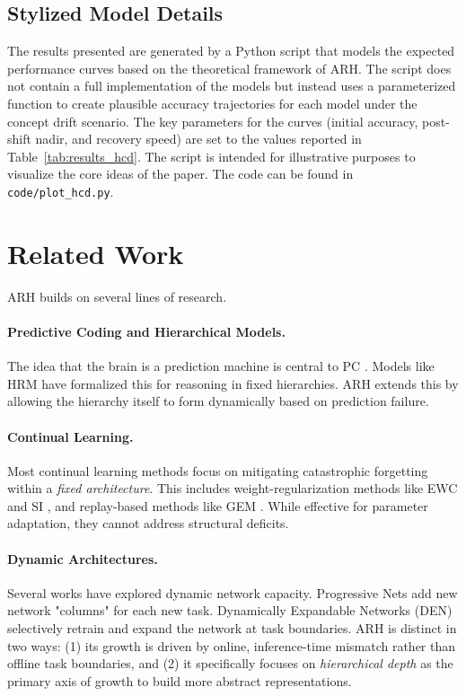 \documentclass{article}
\begin{document}
\subsection{Stylized Model Details}
The results presented are generated by a Python script that models the expected performance curves based on the theoretical framework of ARH. The script does not contain a full implementation of the models but instead uses a parameterized function to create plausible accuracy trajectories for each model under the concept drift scenario. The key parameters for the curves (initial accuracy, post-shift nadir, and recovery speed) are set to the values reported in Table~\ref{tab:results_hcd}. The script is intended for illustrative purposes to visualize the core ideas of the paper. The code can be found in \texttt{code/plot\_hcd.py}.

\section{Related Work}
ARH builds on several lines of research.
\paragraph{Predictive Coding and Hierarchical Models.} The idea that the brain is a prediction machine is central to PC \citep{Rao1999}. Models like HRM \citep{HRM2025} have formalized this for reasoning in fixed hierarchies. ARH extends this by allowing the hierarchy itself to form dynamically based on prediction failure.
\paragraph{Continual Learning.} Most continual learning methods focus on mitigating catastrophic forgetting within a \emph{fixed architecture}. This includes weight-regularization methods like EWC \citep{ewc2017} and SI \citep{si2017}, and replay-based methods like GEM \citep{gem2017}. While effective for parameter adaptation, they cannot address structural deficits.
\paragraph{Dynamic Architectures.} Several works have explored dynamic network capacity. Progressive Nets \citep{rusu2016} add new network "columns" for each new task. Dynamically Expandable Networks (DEN) \citep{den2018} selectively retrain and expand the network at task boundaries. ARH is distinct in two ways: (1) its growth is driven by online, inference-time mismatch rather than offline task boundaries, and (2) it specifically focuses on \emph{hierarchical depth} as the primary axis of growth to build more abstract representations.
\end{document}
